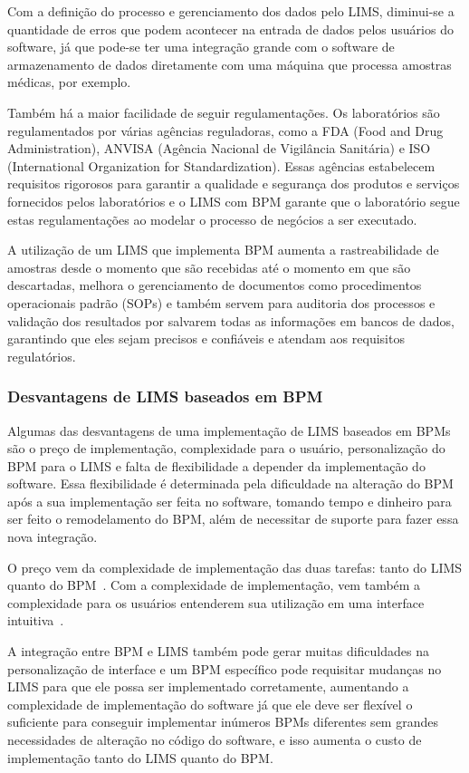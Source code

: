 Com a definição do processo e gerenciamento dos dados pelo LIMS, diminui-se a quantidade de erros que podem acontecer na entrada de dados pelos usuários do software, já que pode-se ter uma integração grande com o software de armazenamento de dados diretamente com uma máquina que processa amostras médicas, por exemplo.

Também há a maior facilidade de seguir regulamentações. Os laboratórios são regulamentados por várias agências reguladoras, como a FDA (Food and Drug Administration), ANVISA (Agência Nacional de Vigilância Sanitária) e ISO (International Organization for Standardization). Essas agências estabelecem requisitos rigorosos para garantir a qualidade e segurança dos produtos e serviços fornecidos pelos laboratórios e o LIMS com BPM garante que o laboratório segue estas regulamentações ao modelar o processo de negócios a ser executado.

A utilização de um LIMS que implementa BPM aumenta a rastreabilidade de amostras desde o momento que são recebidas até o momento em que são descartadas, melhora o gerenciamento de documentos como procedimentos operacionais padrão (SOPs) e também servem para auditoria dos processos e validação dos resultados por salvarem todas as informações em bancos de dados, garantindo que eles sejam precisos e confiáveis e atendam aos requisitos regulatórios.


\subsubsection{Desvantagens de LIMS baseados em BPM}

Algumas das desvantagens de uma implementação de LIMS baseados em BPMs são o preço de implementação, complexidade para o usuário, personalização do BPM para o LIMS e falta de flexibilidade a depender da implementação do software. Essa flexibilidade é determinada pela dificuldade na alteração do BPM após a sua implementação ser feita no software, tomando tempo e dinheiro para ser feito o remodelamento do BPM, além de necessitar de suporte para fazer essa nova integração.

O preço vem da complexidade de implementação das duas tarefas: tanto do LIMS quanto do BPM~\cite{Mutschler2013UnderstandingTechnology}. Com a complexidade de implementação, vem também a complexidade para os usuários entenderem sua utilização em uma interface intuitiva~\cite{Cardoso2006AModels}.

A integração entre BPM e LIMS também pode gerar muitas dificuldades na personalização de interface e um BPM específico pode requisitar mudanças no LIMS para que ele possa ser implementado corretamente, aumentando a complexidade de implementação do software já que ele deve ser flexível o suficiente para conseguir implementar inúmeros BPMs diferentes sem grandes necessidades de alteração no código do software, e isso aumenta o custo de implementação tanto do LIMS quanto do BPM.